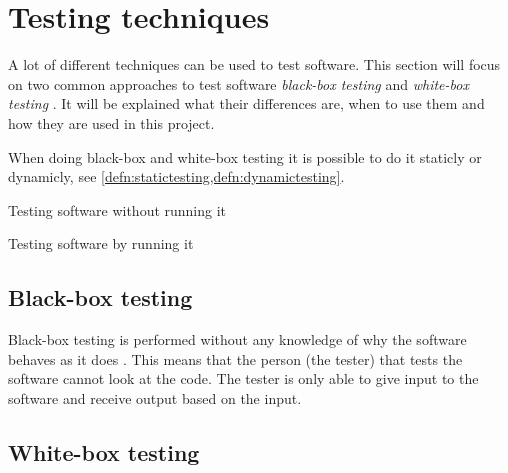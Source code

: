 \section{Testing techniques} \label{sec:testingtechniques}
A lot of different techniques can be used to test software.
This section will focus on two common approaches to test software \textit{black-box testing} and \textit{white-box testing} \cite{SoftwareTesting}.
It will be explained what their differences are, when to use them and how they are used in this project.

When doing black-box and white-box testing it is possible to do it staticly or dynamicly, see \cref{defn:statictesting,defn:dynamictesting}.

\begin{defn} \label{defn:statictesting}
Testing software without running it
\end{defn}

\begin{defn} \label{defn:dynamictesting}
Testing software by running it
\end{defn}

\subsection{Black-box testing} \label{sec:blackboxtesting}
Black-box testing is performed without any knowledge of why the software behaves as it does \cite{SoftwareTesting}.
This means that the person (the tester) that tests the software cannot look at the code.
The tester is only able to give input to the software and receive output based on the input.






\subsection{White-box testing} \label{sec:whiteboxtesting}
